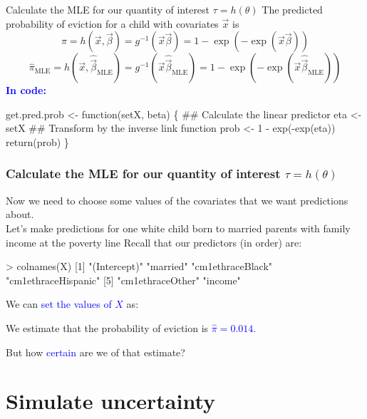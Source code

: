 \documentclass[handout]{beamer}
\newcommand{\blue}[1]{\textcolor{blue}{#1}}
\newcommand{\bblue}[1]{\textbf{\textcolor{blue}{#1}}}
\begin{document}
\begin{frame}[fragile]{Calculate the MLE for our quantity of interest $\tau = h(\theta)$}
The predicted probability of eviction for a child with covariates $\vec{x}$ is
$$\pi = h\left(\vec{x},\vec\beta\right) = g^{-1}\left(\vec{x}\vec\beta\right) = 1 - \exp\left(-\exp\left(\vec{x}\vec\beta\right)\right)$$
$$\hat\pi_\text{MLE} = h\left(\vec{x},\hat{\vec\beta}_\text{MLE}\right) = g^{-1}\left(\vec{x}\hat{\vec\beta}_\text{MLE}\right) = 1 - \exp\left(-\exp\left(\vec{x}\hat{\vec\beta}_\text{MLE}\right)\right)$$
\bblue{In code:}
\begin{footnotesize}
\begin{semiverbatim}
get.pred.prob <- function(setX, beta) \{
  ## Calculate the linear predictor
  eta <- setX %
  ## Transform by the inverse link function
  prob <- 1 - exp(-exp(eta))
  return(prob)
\}
\end{semiverbatim}
\end{footnotesize}
\end{frame}

\begin{frame}[fragile]
\frametitle{Calculate the MLE for our quantity of interest $\tau = h(\theta)$}
\pause
Now we need to choose some values of the covariates that we want predictions about.\\
\pause
\bigskip
Let's make predictions for one white child born to married parents with family income at the poverty line
Recall that our predictors (in order) are:
\begin{tiny}
\begin{semiverbatim}
> colnames(X)
[1] "(Intercept)"        "married"            "cm1ethraceBlack"    "cm1ethraceHispanic"
[5] "cm1ethraceOther"    "income" 
\end{semiverbatim}
\end{tiny}
We can \blue{set the values of $X$} as:
\pause
{}
We estimate that the probability of eviction is \blue{$\hat\pi = 0.014$.}
\end{frame}

\begin{frame}
\centering \huge But how \blue{certain} are we of that estimate?
\end{frame}

\section{Simulate uncertainty}
\end{document}
